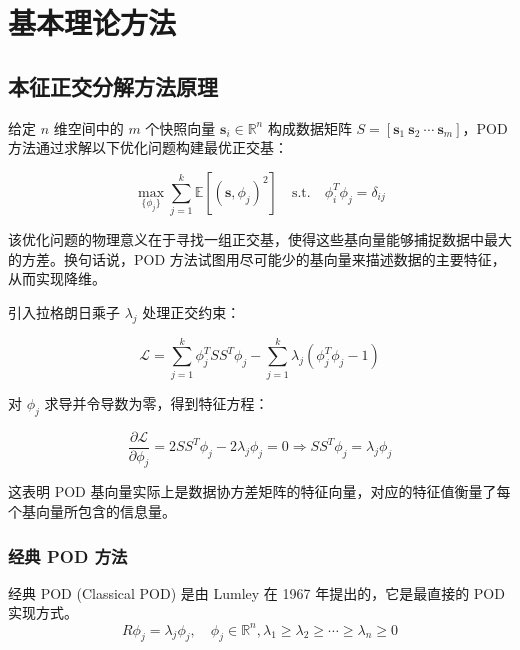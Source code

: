                 \chapter{基本理论方法}
\label{cha:sysu-thesis-contents-format-requirement}

\section{本征正交分解方法原理}

给定 $n$ 维空间中的 $m$ 个快照向量 $\mathbf{s}_i \in \mathbb{R}^n$ 构成数据矩阵 $S = [\mathbf{s}_1\ \mathbf{s}_2\ \cdots\ \mathbf{s}_m]$，POD 方法通过求解以下优化问题构建最优正交基：

\begin{equation}
    \max_{\{\phi_j\}} \sum_{j=1}^k \mathbb{E}[(\mathbf{s},\phi_j)^2] \quad \text{s.t.} \quad \phi_i^T\phi_j = \delta_{ij}
    \label{eq:pod_optimization}
\end{equation}

该优化问题的物理意义在于寻找一组正交基，使得这些基向量能够捕捉数据中最大的方差。换句话说，POD 方法试图用尽可能少的基向量来描述数据的主要特征，从而实现降维。

引入拉格朗日乘子 $\lambda_j$ 处理正交约束：

\begin{equation}
    \mathcal{L} = \sum_{j=1}^k \phi_j^T S S^T \phi_j - \sum_{j=1}^k \lambda_j (\phi_j^T\phi_j - 1)
    \label{eq:lagrangian}
\end{equation}

对 $\phi_j$ 求导并令导数为零，得到特征方程：

\begin{equation}
    \frac{\partial \mathcal{L}}{\partial \phi_j} = 2S S^T \phi_j - 2\lambda_j \phi_j = 0 \Rightarrow S S^T \phi_j = \lambda_j \phi_j
    \label{eq:eigen_equation}
\end{equation}

这表明 POD 基向量实际上是数据协方差矩阵的特征向量，对应的特征值衡量了每个基向量所包含的信息量。

\subsection{经典 POD 方法}
经典 POD (Classical POD) 是由 Lumley 在 1967 年提出的，它是最直接的 POD 实现方式。
\begin{equation}
R \phi_j = \lambda_j \phi_j, \quad \phi_j \in \mathbb{R}^n, \lambda_1 \geq \lambda_2 \geq \cdots \geq \lambda_n \geq 0
\end{equation}

